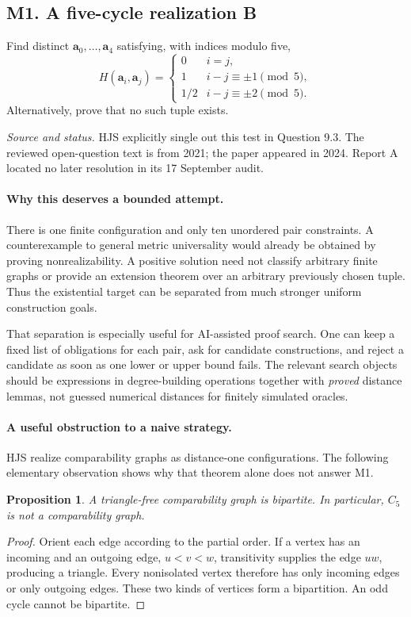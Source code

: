 \documentclass[11pt,a4paper]{article}
\newcommand{\adeg}{\mathbf a}\newcommand{\bdeg}{\mathbf b}
\newcommand{\Wmark}{\textbf{B}}\newcommand{\Pmark}{\textbf{R}}\newcommand{\Lmark}{\textbf{H}}
\newcommand{\status}[1]{\par\noindent\textit{Source and status.} #1\par}
\newtheorem{proposition}[theorem]{Proposition}
\theoremstyle{definition}\newtheorem{definition}[theorem]{Definition}
\theoremstyle{remark}\newtheorem{remark}[theorem]{Remark}
\begin{document}
\subsection{M1. A five-cycle realization \Wmark}
\label{entry:M1}
\label{sec:c5}

Find distinct $\adeg_0,\ldots,\adeg_4$ satisfying, with indices modulo five,
\begin{equation}\label{eq:c5}
 H(\adeg_i,\adeg_j)=
 \begin{cases}
  0 & i=j,\\
  1 & i-j\equiv\pm1\pmod5,\\
  1/2 & i-j\equiv\pm2\pmod5.
 \end{cases}
\end{equation}
Alternatively, prove that no such tuple exists.
\status{HJS explicitly single out this test in Question 9.3. The reviewed open-question text is from 2021; the paper appeared in 2024. Report A located no later resolution in its 17 September audit.\cite{HJS}}

\paragraph{Why this deserves a bounded attempt.}
There is one finite configuration and only ten unordered pair constraints. A counterexample to general metric universality would already be obtained by proving nonrealizability. A positive solution need not classify arbitrary finite graphs or provide an extension theorem over an arbitrary previously chosen tuple. Thus the existential target can be separated from much stronger uniform construction goals.

That separation is especially useful for AI-assisted proof search. One can keep a fixed list of obligations for each pair, ask for candidate constructions, and reject a candidate as soon as one lower or upper bound fails. The relevant search objects should be expressions in degree-building operations together with \emph{proved} distance lemmas, not guessed numerical distances for finitely simulated oracles.

\paragraph{A useful obstruction to a naive strategy.}
HJS realize comparability graphs as distance-one configurations.\cite{HJS} The following elementary observation shows why that theorem alone does not answer M1.

\begin{proposition}\label{prop:comparability}
A triangle-free comparability graph is bipartite. In particular, $C_5$ is not a comparability graph.
\end{proposition}
\begin{proof}
Orient each edge according to the partial order. If a vertex has an incoming and an outgoing edge, $u<v<w$, transitivity supplies the edge $uw$, producing a triangle. Every nonisolated vertex therefore has only incoming edges or only outgoing edges. These two kinds of vertices form a bipartition. An odd cycle cannot be bipartite.
\end{proof}
\end{document}
